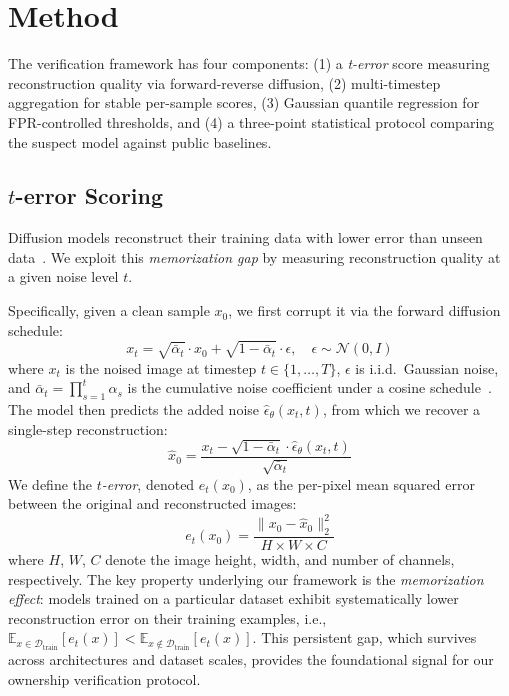 \documentclass[sigconf, review, anonymous]{acmart}
\begin{document}
\section{Method}
\label{sec:method}

The verification framework has four components:
(1) a \emph{t-error} score measuring reconstruction quality via forward-reverse diffusion,
(2) multi-timestep aggregation for stable per-sample scores, (3) Gaussian quantile regression for FPR-controlled thresholds,
and (4) a three-point statistical protocol comparing the suspect model against public baselines.

\subsection{$t$-error Scoring}
\label{sec:t_error}

Diffusion models reconstruct their training data with lower error than unseen data~\citep{carlini2023extracting}. We exploit this \emph{memorization gap} by measuring reconstruction quality at a given noise level $t$.

Specifically, given a clean sample $x_0$, we first corrupt it via the forward diffusion schedule:
\begin{equation}
x_t = \sqrt{\bar{\alpha}_t} \cdot x_0 + \sqrt{1 - \bar{\alpha}_t} \cdot \epsilon, \quad \epsilon \sim \mathcal{N}(0, I)
\end{equation}
where $x_t$ is the noised image at timestep $t \in \{1,\ldots,T\}$, $\epsilon$ is i.i.d.\ Gaussian noise, and $\bar{\alpha}_t = \prod_{s=1}^{t} \alpha_s$ is the cumulative noise coefficient under a cosine schedule~\citep{dhariwal2021diffusion}. The model then predicts the added noise $\hat{\epsilon}_\theta(x_t, t)$, from which we recover a single-step reconstruction:
\begin{equation}
\hat{x}_0 = \frac{x_t - \sqrt{1 - \bar{\alpha}_t} \cdot \hat{\epsilon}_\theta(x_t, t)}{\sqrt{\bar{\alpha}_t}}
\end{equation}
We define the \emph{$t$-error}, denoted $e_t(x_0)$, as the per-pixel mean squared error between the original and reconstructed images:
\begin{equation}
e_t(x_0) = \frac{\|x_0 - \hat{x}_0\|_2^2}{H \times W \times C}
\end{equation}
where $H$, $W$, $C$ denote the image height, width, and number of channels, respectively. The key property underlying our framework is the \emph{memorization effect}: models trained on a particular dataset exhibit systematically lower reconstruction error on their training examples, i.e., $\mathbb{E}_{x \in \mathcal{D}_{\mathrm{train}}}[e_t(x)] < \mathbb{E}_{x \notin \mathcal{D}_{\mathrm{train}}}[e_t(x)]$. This persistent gap, which survives across architectures and dataset scales, provides the foundational signal for our ownership verification protocol.
\end{document}
